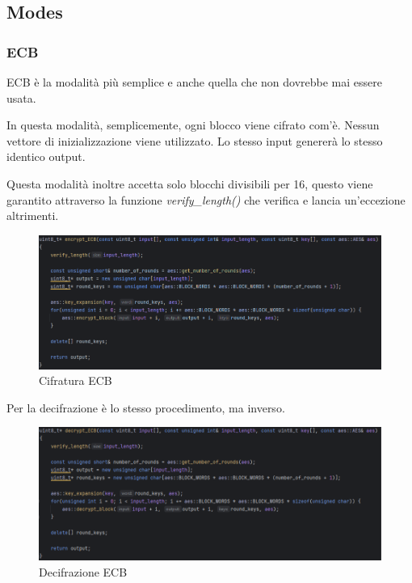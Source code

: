 
\subsection{Modes}

\textsf{\small } %


\subsubsection{ECB}

\textsf{\small ECB è la modalità più semplice e anche quella che non dovrebbe mai essere usata.} %

\textsf{\small In questa modalità, semplicemente, ogni blocco viene cifrato com'è. Nessun vettore di inizializzazione viene utilizzato. Lo stesso input genererà lo stesso identico output.}

\textsf{\small Questa modalità inoltre accetta solo blocchi divisibili per 16, questo viene garantito attraverso la funzione \emph{verify\_length()} che verifica e lancia un'eccezione altrimenti.}

\begin{figure}[H]
	\centering
	\includegraphics[width=1\textwidth, height=1\textheight, keepaspectratio]{./images/code/cpp/modes/encrypt_ECB.PNG}
	\caption{Cifratura ECB}
	\label{fig:encrypt_ECB}
\end{figure}

\textsf{\small Per la decifrazione è lo stesso procedimento, ma inverso. } %

\begin{figure}[H]
	\centering
	\includegraphics[width=1\textwidth, height=1\textheight, keepaspectratio]{./images/code/cpp/modes/decrypt_ECB.PNG}
	\caption{Decifrazione ECB}
	\label{fig:decrypt_ECB}
\end{figure}

